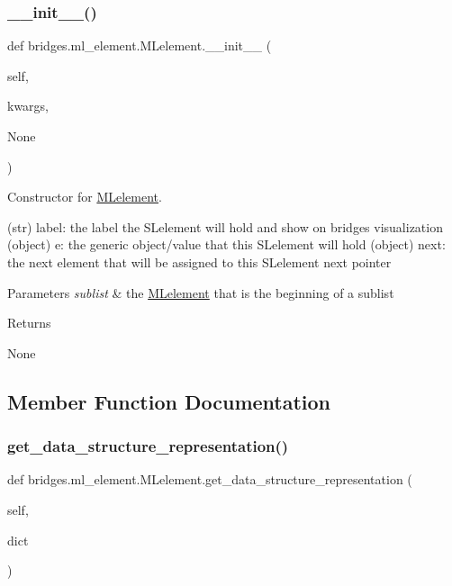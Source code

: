 \subsubsection{\texorpdfstring{\+\_\+\+\_\+init\+\_\+\+\_\+()}{\_\_init\_\_()}}
{\footnotesize\ttfamily def bridges.\+ml\+\_\+element.\+M\+Lelement.\+\_\+\+\_\+init\+\_\+\+\_\+ (\begin{DoxyParamCaption}\item[{}]{self,  }\item[{}]{kwargs,  }\item[{}]{None }\end{DoxyParamCaption})}



Constructor for \mbox{\hyperlink{classbridges_1_1ml__element_1_1_m_lelement}{M\+Lelement}}. 

(str) label\+: the label the S\+Lelement will hold and show on bridges visualization (object) e\+: the generic object/value that this S\+Lelement will hold (object) next\+: the next element that will be assigned to this S\+Lelement next pointer 
\begin{DoxyParams}{Parameters}
{\em sublist} & the \mbox{\hyperlink{classbridges_1_1ml__element_1_1_m_lelement}{M\+Lelement}} that is the beginning of a sublist \\
\hline
\end{DoxyParams}
\begin{DoxyReturn}{Returns}


None 
\end{DoxyReturn}


\subsection{Member Function Documentation}
\mbox{\label{classbridges_1_1ml__element_1_1_m_lelement_a7d176b966746a889f9234d4a76b99c0c}} 
\subsubsection{\texorpdfstring{get\+\_\+data\+\_\+structure\+\_\+representation()}{get\_data\_structure\_representation()}}
{\footnotesize\ttfamily def bridges.\+ml\+\_\+element.\+M\+Lelement.\+get\+\_\+data\+\_\+structure\+\_\+representation (\begin{DoxyParamCaption}\item[{}]{self,  }\item[{}]{dict }\end{DoxyParamCaption})}



